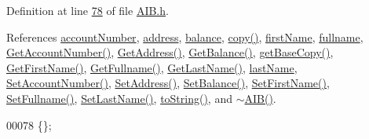 Definition at line \hyperlink{_a_i_b_8h_source_l00078}{78} of file \hyperlink{_a_i_b_8h_source}{A\+I\+B.\+h}.



References \hyperlink{_a_i_b_8h_source_l00123}{account\+Number}, \hyperlink{_a_i_b_8h_source_l00131}{address}, \hyperlink{_a_i_b_8h_source_l00127}{balance}, \hyperlink{_a_i_b_8cpp_source_l00041}{copy()}, \hyperlink{_a_i_b_8h_source_l00115}{first\+Name}, \hyperlink{_a_i_b_8h_source_l00111}{fullname}, \hyperlink{_a_i_b_8cpp_source_l00096}{Get\+Account\+Number()}, \hyperlink{_a_i_b_8cpp_source_l00072}{Get\+Address()}, \hyperlink{_a_i_b_8cpp_source_l00084}{Get\+Balance()}, \hyperlink{_a_i_b_8cpp_source_l00025}{get\+Base\+Copy()}, \hyperlink{_a_i_b_8cpp_source_l00120}{Get\+First\+Name()}, \hyperlink{_a_i_b_8cpp_source_l00132}{Get\+Fullname()}, \hyperlink{_a_i_b_8cpp_source_l00108}{Get\+Last\+Name()}, \hyperlink{_a_i_b_8h_source_l00119}{last\+Name}, \hyperlink{_a_i_b_8cpp_source_l00090}{Set\+Account\+Number()}, \hyperlink{_a_i_b_8cpp_source_l00066}{Set\+Address()}, \hyperlink{_a_i_b_8cpp_source_l00078}{Set\+Balance()}, \hyperlink{_a_i_b_8cpp_source_l00114}{Set\+First\+Name()}, \hyperlink{_a_i_b_8cpp_source_l00126}{Set\+Fullname()}, \hyperlink{_a_i_b_8cpp_source_l00102}{Set\+Last\+Name()}, \hyperlink{_a_i_b_8cpp_source_l00059}{to\+String()}, and \hyperlink{_a_i_b_8cpp_source_l00019}{$\sim$\+A\+I\+B()}.


\begin{DoxyCode}
00078 \{\};
\end{DoxyCode}


